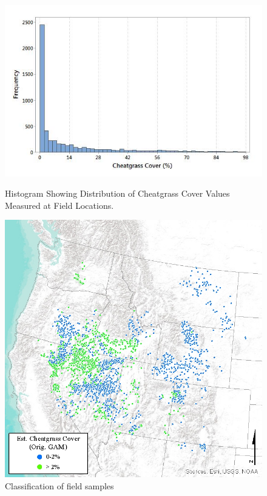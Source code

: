 \def\year{2017}\relax \documentclass[letterpaper]{article}
\begin{document}
\begin{figure}
\centering
\begin{minipage}{.48\textwidth}
  \centering
  \includegraphics[width=\textwidth]{pics/cov.png}
 \caption{Histogram Showing Distribution of Cheatgrass Cover Values Measured at Field Locations.}\label{fig:cov}
\end{minipage}
\begin{minipage}{.04\textwidth}
\end{minipage}
\begin{minipage}{.48\textwidth}
  \centering
  \includegraphics[width=\textwidth]{pics/field_samp_3Mar2016_oGAM_covclass.jpg}
\caption{Classification of field samples}\label{fig:covclass}
\end{minipage}
\end{figure}
\end{document}
